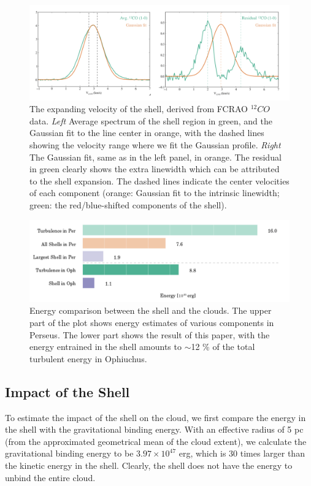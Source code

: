 \documentclass[11pt,a4paper]{emulateapj}
\begin{document}
\begin{figure}[ht]
\centering
\includegraphics[scale=0.5]{fig/v_exp}
\caption{The expanding velocity of the shell, derived from FCRAO $^{12}CO$ data. {\it Left} Average spectrum of the shell region in green, and the Gaussian fit to the line center in orange, with the dashed lines showing the velocity range where we fit the Gaussian profile. {\it Right} The Gaussian fit, same as in the left panel, in orange. The residual in green clearly shows the extra linewidth which can be attributed to the shell expansion. The dashed lines indicate the center velocities of each component (orange: Gaussian fit to the intrinsic linewidth; green: the red/blue-shifted components of the shell).
}
\end{figure}

\begin{figure}[ht]
\centering
\includegraphics[scale=0.35]{fig/bar_energy.png}
\caption{Energy comparison between the shell and the clouds. The upper part of the plot shows energy estimates of various components in Perseus. The lower part shows the result of this paper, with the energy entrained in the shell amounts to $\sim$12 \% of the total turbulent energy in Ophiuchus.
}
\end{figure}

\subsection{Impact of the Shell}
To estimate the impact of the shell on the cloud, we first compare the energy in the shell with the gravitational binding energy. With an effective radius of 5 pc (from the approximated geometrical mean of the cloud extent), we calculate the gravitational binding energy to be $3.97\times10^{47}$ erg, which is 30 times larger than the kinetic energy in the shell. Clearly, the shell does not have the energy to unbind the entire cloud.
\end{document}
